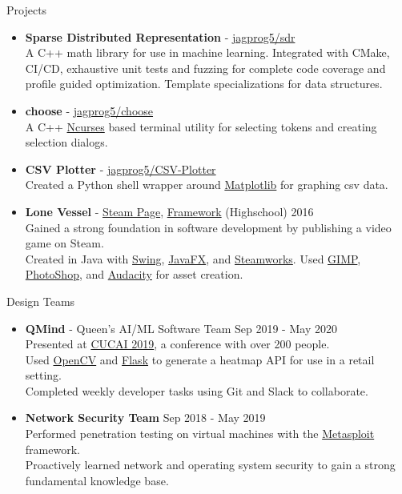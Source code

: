 \documentclass{resume} %
\begin{document}
\begin{rSection}{Projects}
\begin{itemize}
    \item {\bf Sparse Distributed Representation} - \href{https://github.com/jagprog5/SDR/}{jagprog5/sdr}\\
    A C++ math library for use in machine learning. Integrated with CMake, CI/CD, exhaustive unit tests and fuzzing for complete code coverage and profile guided optimization. Template specializations for data structures.
    \item {\bf choose} - \href{https://github.com/jagprog5/choose/}{jagprog5/choose}\\
    A C++ \href{https://en.wikipedia.org/wiki/Ncurses}{Ncurses} based terminal utility for selecting tokens and creating selection dialogs.
    \item {\bf CSV Plotter} - \href{https://github.com/jagprog5/CSV-Plotter}{jagprog5/CSV-Plotter}\\
    Created a Python shell wrapper around \href{https://matplotlib.org/}{Matplotlib} for graphing csv data. 
    \item {\bf Lone Vessel} - \href{https://store.steampowered.com/app/687420/Lone_Vessel/}{Steam Page}, \href{https://www.youtube.com/watch?v=X63V_5YDLC0}{Framework}
    \hfill {(Highschool) 2016}\\
    Gained a strong foundation in software development by publishing a video game on Steam.\\
    Created in Java with \href{https://www.javatpoint.com/java-swing}{Swing}, \href{https://openjfx.io/}{JavaFX}, and \href{https://partner.steamgames.com/doc/api}{Steamworks}.
    Used \href{https://www.gimp.org/}{GIMP}, \href{https://www.adobe.com/ca/products/photoshop.html}{PhotoShop}, and \href{https://www.audacityteam.org/}{Audacity} for asset creation. 
\end{itemize}

\begin{rSection}{Design Teams}
\begin{itemize}
    \item {\bf QMind} - Queen's AI/ML Software Team \hfill {Sep 2019 - May 2020}\\
    Presented at \href{https://medium.com/qmind-ai/cucai2019-c9d5f848f5c}{CUCAI 2019}, a conference with over 200 people.\\
    Used \href{https://opencv.org/}{OpenCV} and \href{https://flask.palletsprojects.com/en/2.2.x/}{Flask} to generate a heatmap API for use in a retail setting.\\
    Completed weekly developer tasks using Git and Slack to collaborate.
    \item {\bf Network Security Team} \hfill {Sep 2018 - May 2019}\\
    Performed penetration testing on virtual machines with the \href{https://www.metasploit.com/}{Metasploit} framework.\\
    Proactively learned network and operating system security to gain a strong fundamental knowledge base.
\end{itemize}
\end{rSection}

\end{rSection}
\end{document}
